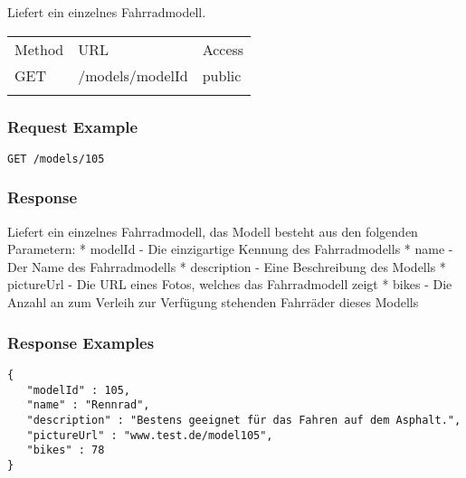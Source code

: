 Liefert ein einzelnes Fahrradmodell.

\begin{longtable}[c]{@{}lll@{}}
\toprule\addlinespace
Method & URL & Access
\\\addlinespace
\midrule\endhead
GET & /models/modelId & public
\\\addlinespace
\bottomrule
\end{longtable}

\subsubsection{Request Example}\label{request-example}

\begin{verbatim}
GET /models/105
\end{verbatim}

\subsubsection{Response}\label{response}

Liefert ein einzelnes Fahrradmodell, das Modell besteht aus den
folgenden Parametern: * modelId - Die einzigartige Kennung des
Fahrradmodells * name - Der Name des Fahrradmodells * description - Eine
Beschreibung des Modells * pictureUrl - Die URL eines Fotos, welches das
Fahrradmodell zeigt * bikes - Die Anzahl an zum Verleih zur Verfügung
stehenden Fahrräder dieses Modells

\subsubsection{Response Examples}\label{response-examples}

\begin{verbatim}
{
   "modelId" : 105,
   "name" : "Rennrad",
   "description" : "Bestens geeignet für das Fahren auf dem Asphalt.",
   "pictureUrl" : "www.test.de/model105",
   "bikes" : 78
}
\end{verbatim}
